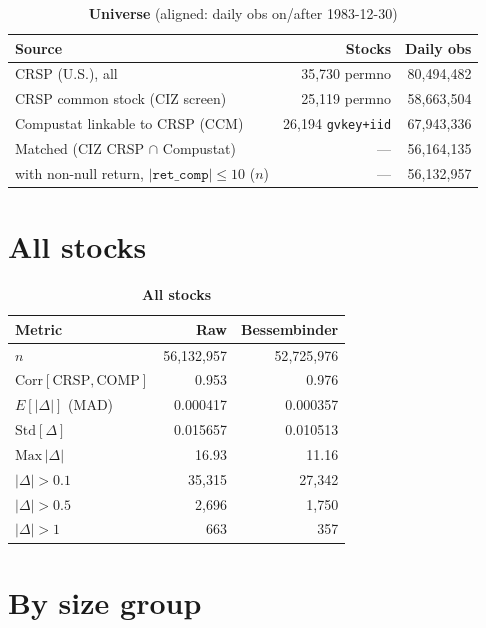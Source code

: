 \documentclass[11pt]{article}
\newcommand{\cmphead}{%
  \toprule
  Metric & Raw & Bessembinder \\
  \midrule
}
\begin{document}
\begin{table}[h]
\centering
\caption*{\textbf{Universe} (aligned: daily obs on/after 1983-12-30)}
\begin{tabular}{lrr}
\toprule
Source & Stocks & Daily obs \\
\midrule
CRSP (U.S.), all                         & 35{,}730 permno & 80{,}494{,}482 \\
CRSP common stock (CIZ screen)           & 25{,}119 permno & 58{,}663{,}504 \\
Compustat linkable to CRSP (CCM)         & 26{,}194 \texttt{gvkey+iid} & 67{,}943{,}336 \\
\midrule
Matched (CIZ CRSP $\cap$ Compustat)      & --- & 56{,}164{,}135 \\
\quad with non-null return, $|\texttt{ret\_comp}|\le10$ ($n$) & --- & 56{,}132{,}957 \\
\bottomrule
\end{tabular}
\end{table}

\section*{All stocks}

\begin{table}[h]
\centering
\caption*{\textbf{All stocks}}
\begin{tabular}{lrr}
\cmphead
$n$                                          & 56{,}132{,}957 & 52{,}725{,}976 \\
$\mathrm{Corr}[\mathrm{CRSP}, \mathrm{COMP}]$& 0.953 & 0.976 \\
$E[|\Delta|]$ (MAD)                          & 0.000417 & 0.000357 \\
$\mathrm{Std}[\Delta]$                       & 0.015657 & 0.010513 \\
$\mathrm{Max}\,|\Delta|$                     & 16.93 & 11.16 \\
$|\Delta|>0.1$                               & 35{,}315 & 27{,}342 \\
$|\Delta|>0.5$                               & 2{,}696 & 1{,}750 \\
$|\Delta|>1$                                 & 663 & 357 \\
\bottomrule
\end{tabular}
\end{table}

\section*{By size group}
\end{document}
